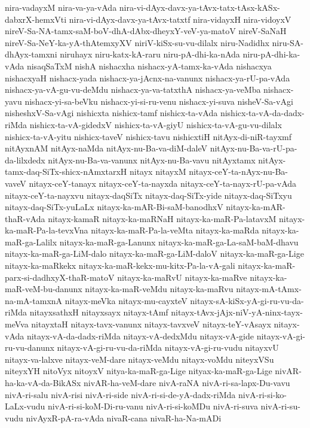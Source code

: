 {nira-vadayxM
nira-va-ya-vAda
nira-vi-dAyx-davx-ya-tAvx-tatx-tAsx-kASx-dabxrX-hemxVti
nira-vi-dAyx-davx-ya-tAvx-tatxtf
nira-vidayxH
nira-vidoyxV
nireV-Sa-NA-tamx-saM-boV-dhA-dAbx-dheyxY-veV-ya-matoV
nireV-SaNaH
nireV-Sa-NeY-ka-yA-thAtemxyXV
niriV-kiSx-su-vu-dilalx
niru-Nadidhx
niru-SA-dhAyx-tamxni
niruhayx
niru-katx-kA-raru
niru-pA-dhi-ka-nAda
niru-pA-dhi-ka-vAda
nisaqSaTxM
nishA
nishacxha
nishacx-yA-tamx-ka-vAda
nishacxya
nishacxyaH
nishacx-yada
nishacx-ya-jAcnx-na-vanunx
nishacx-ya-rU-pa-vAda
nishacx-ya-vA-gu-vu-deMdu
nishacx-ya-va-tatxthA
nishacx-ya-veMba
nishacx-yavu
nishacx-yi-sa-beVku
nishacx-yi-si-ru-venu
nishacx-yi-suva
nisheV-Sa-vAgi
nisheshxV-Sa-vAgi
nishicxta
nishicx-tamf
nishicx-ta-vAda
nishicx-ta-vA-da-dadx-riMda
nishicx-ta-vA-gidedxV
nishicx-ta-vA-giyU
nishicx-ta-vA-gu-vu-dilalx
nishicx-ta-vA-yitu
nishicx-taveV
nishicx-tavu
nishicxtiH
nitAyx-di-niR-tayxmf
nitAyxnAM
nitAyx-naMda
nitAyx-nu-Ba-va-diM-daleV
nitAyx-nu-Ba-va-rU-pa-da-lilxdedx
nitAyx-nu-Ba-va-vanunx
nitAyx-nu-Ba-vavu
nitAyxtamx
nitAyx-tamx-daq-SiTx-shicx-nAmxtarxH
nitayx
nitayxM
nitayx-ceY-ta-nAyx-nu-Ba-vaveV
nitayx-ceY-tanayx
nitayx-ceY-ta-nayxda
nitayx-ceY-ta-nayx-rU-pa-vAda
nitayx-ceY-ta-nayxvu
nitayx-daqSiTx
nitayx-daq-SiTx-yide
nitayx-daq-SiTxyu
nitayx-daq-SiTx-yuLaLx
nitayx-ka-mAR-Bi-saM-banodhxV
nitayx-ka-mAR-thaR-vAda
nitayx-kamaR
nitayx-ka-maRNaH
nitayx-ka-maR-Pa-latavxM
nitayx-ka-maR-Pa-la-tevxVna
nitayx-ka-maR-Pa-la-veMta
nitayx-ka-maRda
nitayx-ka-maR-ga-Lalilx
nitayx-ka-maR-ga-Lanunx
nitayx-ka-maR-ga-La-saM-baM-dhavu
nitayx-ka-maR-ga-LiM-dalo
nitayx-ka-maR-ga-LiM-daloV
nitayx-ka-maR-ga-Lige
nitayx-ka-maRkekx
nitayx-ka-maR-kekx-mu-kitx-Pa-la-vA-gali
nitayx-ka-maR-parx-si-dadhxyX-thaR-matoV
nitayx-ka-maRvU
nitayx-ka-maRve
nitayx-ka-maR-veM-bu-danunx
nitayx-ka-maR-veMdu
nitayx-ka-maRvu
nitayx-mA-tAmx-na-mA-tamxnA
nitayx-meVka
nitayx-mu-cayxteV
nitayx-sA-kiSx-yA-gi-ru-vu-da-riMda
nitayxsathxH
nitayxsayx
nitayx-tAmf
nitayx-tAvx-jAjx-niV-yA-ninx-tayx-meVva
nitayxtaH
nitayx-tavx-vanunx
nitayx-tavxveV
nitayx-teY-vAsayx
nitayx-vAda
nitayx-vA-da-dadx-riMda
nitayx-vA-dedxMdu
nitayx-vA-gide
nitayx-vA-gi-ru-vu-danunx
nitayx-vA-gi-ru-vu-da-riMda
nitayx-vA-gi-ru-vudu
nitayxvU
nitayx-va-lalxve
nitayx-veM-dare
nitayx-veMdu
nitayx-voMdu
niteyxVSu
niteyxYH
nitoVyx
nitoyxV
nitya-ka-maR-ga-Lige
nityax-ka-maR-ga-Lige
nivAR-ha-ka-vA-da-BikASx
nivAR-ha-veM-dare
nivA-raNA
nivA-ri-sa-lapx-Du-vavu
nivA-ri-salu
nivA-risi
nivA-ri-side
nivA-ri-si-de-yA-dadx-riMda
nivA-ri-si-ko-LaLx-vudu
nivA-ri-si-koM-Di-ru-vanu
nivA-ri-si-koMDu
nivA-ri-suva
nivA-ri-su-vudu
nivAyxR-pA-ra-vAda
nivaR-cana
nivaR-ha-Na-mADi
}
